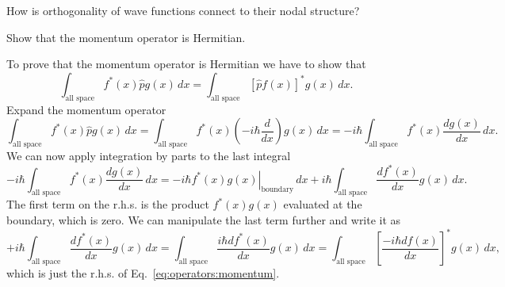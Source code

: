 \documentclass[../Main/chem331-notes.tex]{subfiles}
\begin{document}
\begin{exercise}
How is orthogonality of wave functions connect to their nodal structure?
\end{exercise}
\begin{exercise}
Show that the momentum operator is Hermitian.
\end{exercise}
To prove that the momentum operator is Hermitian we have to show that
\begin{equation}
\label{eq:operators:momentum}
\int_\text{all space} f^*(x) \hat{p} g(x) \, dx = \int_\text{all space} [\hat{p} f(x)]^*  g(x) \, dx.
\end{equation}
Expand the momentum operator
\begin{equation}
\int_\text{all space} f^*(x) \hat{p} g(x) \, dx =
\int_\text{all space} f^*(x) \left(-i \hbar \frac{d}{dx}\right) g(x) \, dx 
= -i \hbar \int_\text{all space} f^*(x)  \frac{d g(x)}{dx}  \, dx .
\end{equation}
We can now apply integration by parts to the last integral
\begin{equation}
-i \hbar \int_\text{all space} f^*(x)  \frac{d g(x)}{dx}  \, dx 
= -i \hbar \left. f^*(x) g(x)\right|_\text{boundary}  \, dx  +i \hbar \int_\text{all space}  \frac{d f^*(x)}{dx} g(x)  \, dx .
\end{equation}
The first term on the r.h.s. is the product $f^*(x) g(x)$ evaluated at the boundary, which is zero.
We can manipulate the last term further and write it as
\begin{equation}
+i \hbar \int_\text{all space}  \frac{d f^*(x)}{dx} g(x)  \, dx
=  \int_\text{all space}  \frac{i \hbar d f^*(x)}{dx} g(x)  \, dx
=  \int_\text{all space}  \left[\frac{-i \hbar d f(x)}{dx}\right]^* g(x)  \, dx,
\end{equation}
which is just the r.h.s. of Eq.~\eqref{eq:operators:momentum}.
\end{document}
